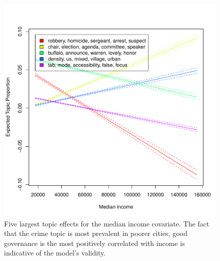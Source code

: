 \documentclass[11pt]{article}
\begin{document}
\begin{figure}[htp]
	\centering
	\caption{Five largest topic effects for the median income covariate. The fact that the crime topic is most prevalent in poorer cities, good governance is the most positively correlated with income is indicative of the model's validity.}
	\label{stmEffectIncome}
	\includegraphics[width=\linewidth]{figures/stm_effect_income.pdf}
\end{figure}
\end{document}
